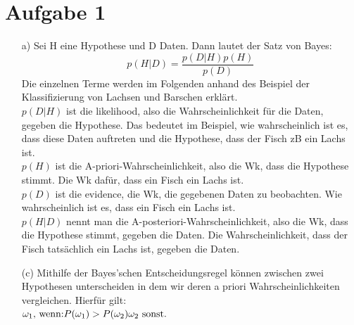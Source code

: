 \documentclass[a4paper]{scrartcl}
\begin{document}
	
\section*{Aufgabe 1}

	\begin{itemize} 
	\item[a)] Sei H eine Hypothese und D Daten. Dann lautet der Satz von Bayes: $$p(H|D) = \frac{p(D|H)p(H)}{p(D)}$$
	Die einzelnen Terme werden im Folgenden anhand des Beispiel der Klassifizierung von Lachsen und Barschen erklärt.\\
	$p(D|H)$ ist die likelihood, also die Wahrscheinlichkeit für die Daten, gegeben die Hypothese. Das bedeutet im Beispiel, wie wahrscheinlich ist es, dass diese Daten auftreten und die Hypothese, dass der Fisch zB ein Lachs ist.\\
	$p(H)$ ist die A-priori-Wahrscheinlichkeit, also die Wk, dass die Hypothese stimmt. Die Wk dafür, dass ein Fisch ein Lachs ist.\\
	$p(D)$ ist die evidence, die Wk, die gegebenen Daten zu beobachten. Wie wahrscheinlich ist es, dass ein Fisch ein Lachs ist.\\
	$p(H|D)$ nennt man die A-posteriori-Wahrscheinlichkeit, also die Wk, dass die Hypothese stimmt, gegeben die Daten. Die Wahrscheinlichkeit, dass der Fisch tatsächlich ein Lachs ist, gegeben die Daten.







\item[(c)]
Mithilfe der Bayes'schen Entscheidungsregel können zwischen zwei Hypothesen unterscheiden in dem wir deren a priori Wahrscheinlichkeiten vergleichen. Hierfür gilt:\\
$
\omega_1 \text{, wenn:} P(\omega_1) > P(\omega_2)\\
\omega_2 \text{ sonst.}
$




\end{itemize}
\end{document}
